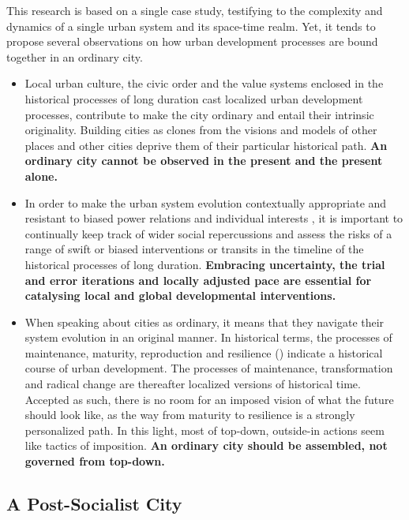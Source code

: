 \documentclass[11pt]{report}
\begin{document}
{{{This research is based on a single case study, testifying to the complexity and dynamics of a single urban system and its space-time realm.
Yet, it tends to propose several observations on how urban development processes are bound together in an ordinary city.

\begin{itemize}
\item
Local urban culture, the civic order and the value systems enclosed in the historical processes of long duration cast localized urban development processes, contribute to make the city ordinary and entail their intrinsic originality.
Building cities as clones from the visions and models of other places and other cities
deprive them of their particular historical path.
\textbf{An ordinary city cannot be observed in the present and the present alone.}

\item 
In order to make the urban system evolution contextually appropriate  and resistant to biased power relations and individual interests , it is important to continually keep track of wider social repercussions and assess the risks of a range of swift or biased interventions or
transits in the timeline of the historical processes of long duration.
\textbf{Embracing uncertainty, the trial and error iterations and locally adjusted pace are essential for catalysing local and global developmental interventions.}

\item
When speaking about cities as ordinary, it means that they navigate their system evolution in an original manner. In historical terms, the processes of maintenance, maturity, reproduction and resilience  (\href{Galtung}{\citealt{galtung_peace_1996}}) indicate a historical course of urban development. The processes of maintenance, transformation and radical change are thereafter localized versions of historical time. Accepted as such, there is no room for an imposed vision of what the future should look like, as the way from maturity to resilience is a strongly personalized path. In this light, most of top-down, outside-in actions seem like tactics of imposition.  \textbf{An ordinary city should be assembled, not governed from top-down.}

\end{itemize}

\subsection{A Post-Socialist City}

}}}
\end{document}

